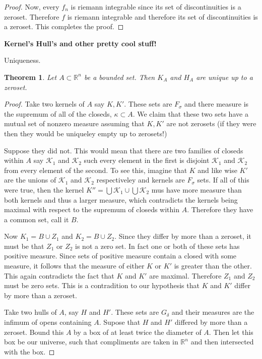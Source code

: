 \documentclass[letter]{article}
\newtheorem{theorem}{Theorem}
\newenvironment{menumerate}{%
  \edef\backupindent{\the\parindent}%
  \enumerate%
  \setlength{\parindent}{\backupindent}%
}{\endenumerate}
\begin{document}
\begin{menumerate}
\begin{proof}
		 Now, every $f_n$ is riemann integrable since its set of discontinuities is a zeroset. Therefore $f$ is riemann integrable and therefore its set of discontinuities is a zeroset. This completes the proof.
	\end{proof}
	\setcounter{enumi}{69}
	\item \textbf{Kernel's Hull's and other pretty cool stuff!}
	\begin{menumerate}
		\item Uniqueness.
		\begin{theorem}
			Let $A \subset \mathbb{R}^n$ be a bounded set. Then $K_A$ and $H_A$ are unique up to a zeroset.
		\end{theorem}
		\begin{proof}
			Take two kernels of $A$ say $K, K'$. These sets are $F_\sigma$ and there measure is the supremum of 
			all of the closeds, $\kappa \subset A$. We claim that these two sets have a mutual set of nonzero measure assuming
			that $K, K'$ are not zerosets (if they were then they would be uniqueley empty up to zerosets!)

			Suppose they did not. This would mean that there are two families of closeds within $A$ say $\mathcal{K}_1$ and $\mathcal{K}_2$ such every element in the first is disjoint $\mathcal{K}_1$ and $\mathcal{K}_2$from every element of the second. To see this, imagine that $K$ and like wise $K'$ are the unions of $\mathcal{K}_1$ and $\mathcal{K}_2$ respectiveley and kernels are $F_\sigma$ sets. If all of this were true, then the kernel $K'' = \bigcup \mathcal{K}_1 \cup \bigcup \mathcal{K}_2$ mus have more measure than both kernels and thus a larger measure, which contradicts the kernels being maximal with respect to the supremum of closeds within $A$. Therefore they have a common set, call it $B.$

			Now $K_1 = B \cup Z_1$ and $K_2 = B \cup Z_2$. Since they differ by more than a zeroset, it must be that $Z_1$ or $Z_2$ is not a zero set. In fact one or both of these sets has positive measure. Since sets of positive measure contain a closed with some measure, it follows that the measure of either $K$ or $K'$ is greater than the other. This again contradicts the fact that $K$ and $K'$ are maximal. Therefore $Z_1$ and $Z_2$ must be zero sets. This is a contradition to our hypothesis that $K$ and $K'$ differ by more than a zeroset.

			Take two hulls of $A$, say $H$ and $H'$. These sets are $G_\delta$ and their measures are the infimum of opens containing $A$. Supose that $H$ and $H'$ differed by more than a zeroset. 
			Bound this  $A$ by a box of at least twice the diameter of $A$. Then let this box be our universe, such that compliments are taken in $\mathbb{R}^n$ and then intersected with the box.


\end{proof}
\end{menumerate}
\end{menumerate}
\end{document}
